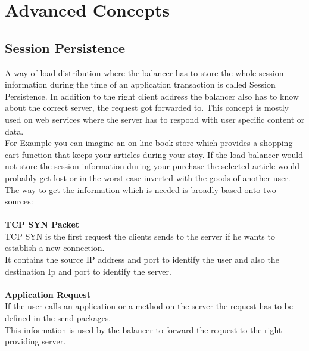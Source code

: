\documentclass[12p]{article}
\begin{document}
	\newpage
	\section{Advanced Concepts}
	\subsection{Session Persistence}
	A way of load distribution where the balancer has to store the whole session information during the time of an application transaction is called Session Persistence. In addition to the right client address the balancer also has to know about the correct server, the request got forwarded to. This concept is mostly used on web services where the server has to respond with user specific content or data.\\
	For Example you can imagine an on-line book store which provides a shopping cart function that keeps your articles during your stay. If the load balancer would not store the session information during your purchase the selected article would probably get lost or in the worst case inverted with the goods of another user.\\
	The way to get the information which is needed is broadly based onto two sources:\\
	\\
	\textbf{TCP SYN Packet}\\
	TCP SYN is the first request the clients sends to the server if he wants to establish a new connection.\\
	It contains the source IP address and port to identify the user and also the destination Ip and port to identify the server.\\
	\\
	\textbf{Application Request}\\
	If the user calls an application or a method on the server the request has to be defined in the send packages.\\
	This information is used by the balancer to forward the request to the right providing server.
	
\end{document}

